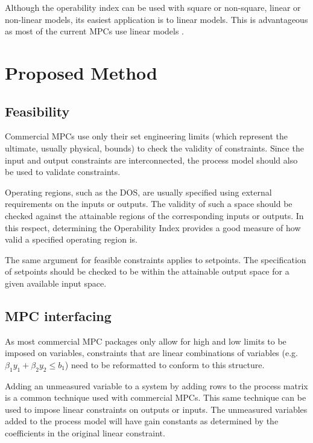 \documentclass[final,authoryear,5pt,times,twocolumn]{elsarticle}
\begin{document}
Although the operability index can be used with square or non-square, linear or non-linear models, its easiest application is to linear models. 
This is advantageous as most of the current MPCs use linear models \citep{vinsonphd}.


\section{Proposed Method}\label{sec:method}

\subsection{Feasibility}\label{sec:feasibility}
Commercial MPCs use only their set engineering limits (which represent the ultimate, usually physical, bounds) to check the validity of constraints.
Since the input and output constraints are interconnected, the process model should also be used to validate constraints.

Operating regions, such as the DOS, are usually specified using external requirements on the inputs or outputs.
The validity of such a space should be checked against the attainable regions of the corresponding inputs or outputs.
In this respect, determining the Operability Index provides a good measure of how valid a specified operating region is.

The same argument for feasible constraints applies to setpoints.
The specification of setpoints should be checked to be within the attainable output space for a given available input space.

\subsection{MPC interfacing}\label{sec:lincons}
As most commercial MPC packages only allow for high and low limits to be imposed on variables, constraints that are linear combinations of variables (e.g. $\beta_1 y_1+\beta_2 y_2\leq b_1$) need to be reformatted to conform to this structure.

Adding an unmeasured variable to a system by adding rows to the process matrix is a common technique used with commercial MPCs.
This same technique can be used to impose linear constraints on outputs or inputs.
The unmeasured variables added to the process model will have gain constants as determined by the coefficients in the original linear constraint.
\end{document}
